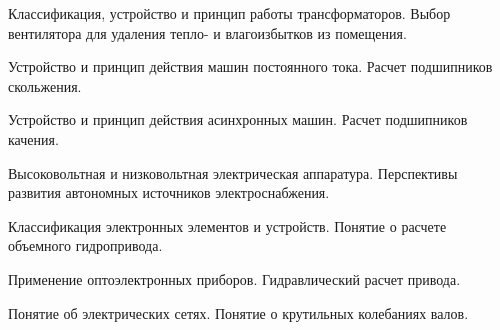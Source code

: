 \documentclass[
	14pt,
	a4paper,
	]
	{scrartcl}
\begin{document}
\shapk
{}
\setcounter{zad}{0}

\vfill
\z Классификация, устройство и принцип работы трансформаторов.
 \vfill
\z Выбор вентилятора для удаления тепло- и влагоизбытков из помещения. \vfill

\vfill

\newpage


\shapk
{}
\setcounter{zad}{0}

\vfill
\z Устройство и принцип действия машин постоянного тока.
 \vfill
\z Расчет подшипников скольжения.
 \vfill

\vfill

\newpage


\shapk
{}
\setcounter{zad}{0}

\vfill
\z Устройство и принцип действия асинхронных машин.
 \vfill
\z Расчет подшипников качения.
 \vfill

\vfill

\newpage


\shapk
{}
\setcounter{zad}{0}

\vfill
\z Высоковольтная и низковольтная электрическая аппаратура.
 \vfill
\z Перспективы развития автономных источников электроснабжения.
 \vfill

\vfill

\newpage


\shapk
{}
\setcounter{zad}{0}

\vfill
\z Классификация электронных элементов и устройств.
 \vfill
\z Понятие о расчете объемного гидропривода.
 \vfill

\vfill

\newpage


\shapk
{}
\setcounter{zad}{0}

\vfill
\z Применение оптоэлектронных приборов.
 \vfill
\z Гидравлический расчет привода.
 \vfill

\vfill

\newpage


\shapk
{}
\setcounter{zad}{0}

\vfill
\z Понятие об электрических сетях.
 \vfill
\z Понятие о крутильных колебаниях валов.
 \vfill

\vfill

\newpage


\shapk
{}
\setcounter{zad}{0}
\end{document}
